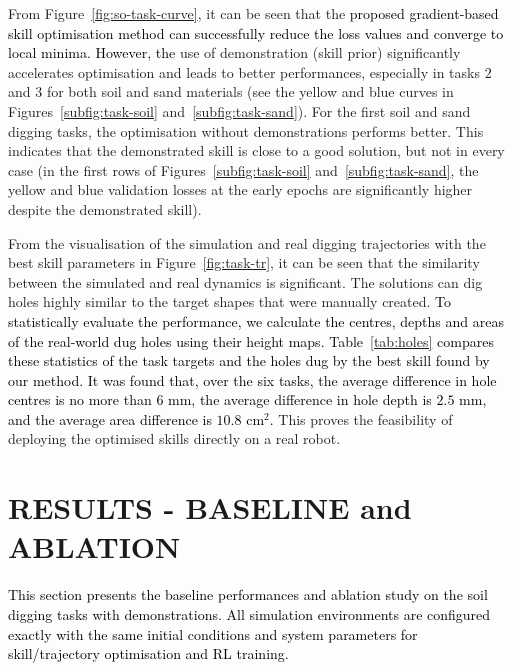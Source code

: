\documentclass[letterpaper, 10 pt, journal, twoside]{ieeetran}
\newcommand{\rp}[1]{\textcolor{black}{#1}}
\newcommand{\rps}[1]{\textcolor{black}{#1}}
\begin{document}
From Figure~\ref{fig:so-task-curve}, it can be seen that the \rp{proposed gradient-based skill optimisation method can successfully reduce the loss values and converge to local minima. However, the} use of demonstration (skill prior) significantly accelerates optimisation and leads to better performances, especially in tasks $2$ and $3$ for both soil and sand materials (see the yellow and blue curves in Figures~\ref{subfig:task-soil} and~\ref{subfig:task-sand}). For the first soil and sand digging tasks, the optimisation without demonstrations performs better. This indicates that the demonstrated skill is close to a good solution, but not in every case (in the first rows of Figures~\ref{subfig:task-soil} and~\ref{subfig:task-sand}, the yellow and blue validation losses at the early epochs are significantly higher despite the demonstrated skill).

From the visualisation of the simulation and real digging trajectories with the best skill parameters in Figure~\ref{fig:task-tr}, it can be seen that the similarity between the simulated and real dynamics is significant. The solutions can dig holes highly similar to the target shapes that were manually created. \rp{To statistically evaluate the performance, we calculate the centres, depths and areas of the real-world dug holes using their height maps. Table~\ref{tab:holes} compares these statistics of the task targets and the holes dug by the best skill found by our method. It was found that, over the six tasks, the average difference in hole centres is no more than $6$ mm, the average difference in hole depth is $2.5$ mm, and the average area difference is $10.8$ cm$^2$.} This proves the feasibility of deploying the optimised skills directly on a real robot.

\section{RESULTS - BASELINE and ABLATION}\label{sec:ablation}
\rp{This section presents the baseline performances and ablation study on the soil digging tasks with demonstrations.} \rps{All simulation environments are configured exactly with the same initial conditions and system parameters for skill/trajectory optimisation and RL training.}
\end{document}
